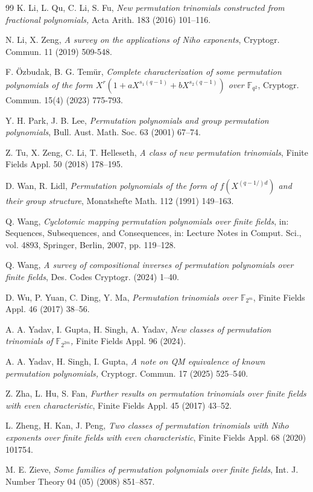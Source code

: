 \documentclass[12pt,reqno]{amsart}
\numberwithin{equation}{section}
\theoremstyle{definition}
\newcommand{\F}{\mathbb F}
\begin{document}
\begin{thebibliography}{99}
 K. Li, L. Qu, C. Li, S. Fu, {\it New permutation trinomials constructed from fractional polynomials,}
Acta Arith. 183 (2016) 101–116.


 N. Li, X. Zeng,  \textit{A survey on the applications of Niho exponents}, Cryptogr. Commun. 11 (2019) 509-548.

F. Özbudak, B. G. Temür, \textit{Complete characterization of some permutation polynomials of the form $X^r (1+ aX^{{s_1}(q-1)}+ bX^{{s_2}(q-1)})$ over $\mathbb{F}_{q^2}$}, Cryptogr. Commun. 15(4) (2023) 775-793.

 Y. H. Park, J. B. Lee, {\it Permutation polynomials and group permutation polynomials}, Bull. Aust. Math. Soc. 63 (2001) 67--74.

Z. Tu, X. Zeng, C. Li, T. Helleseth,  \textit{ A class of new permutation trinomials}, Finite Fields Appl. 50 (2018) 178--195.

 D. Wan, R. Lidl, {\it Permutation polynomials of the form of $f(X^{(q-1/)d})$ and their group structure}, Monatshefte Math. 112 (1991) 149--163.
	
 Q. Wang, {\it Cyclotomic mapping permutation polynomials over finite fields}, in: Sequences, Subsequences, and Consequences, in: Lecture Notes in Comput. Sci., vol. 4893, Springer, Berlin, 2007, pp. 119--128.

Q. Wang,  \textit{A survey of compositional inverses of permutation polynomials over finite fields}, Des. Codes Cryptogr. (2024) 1--40.

D. Wu, P. Yuan, C. Ding, Y. Ma,   \textit{Permutation trinomials over $\mathbb{F}_{2^m}$}, Finite Fields Appl. 46 (2017) 38--56.

 A. A. Yadav, I. Gupta, H. Singh, A. Yadav, {\it New classes of permutation trinomials of $\F_{2^{2m}}$, } Finite Fields Appl. 96 (2024).

 A. A. Yadav, H. Singh, I. Gupta, {\it A note on QM equivalence of known permutation polynomials,} Cryptogr. Commun. 17 (2025) 525--540.

  Z. Zha, L. Hu, S. Fan, {\it Further results on permutation trinomials over finite fields with even characteristic}, Finite Fields Appl. 45 (2017) 43--52.

 L. Zheng, H. Kan, J. Peng, \textit{Two classes of permutation trinomials with Niho exponents over finite
fields with even characteristic}, Finite Fields Appl. 68 (2020) 101754.

 M. E. Zieve, {\it Some families of permutation polynomials over finite fields}, Int. J. Number Theory 04 (05) (2008) 851--857.

\end{thebibliography}	
\end{document}
